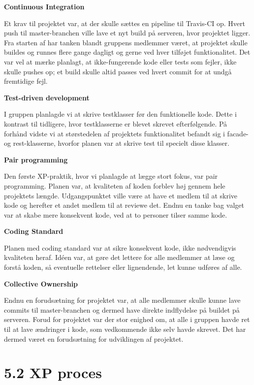 \documentclass[11pt]{report}
\begin{document}
\noindent\textbf{Continuous Integration}

Et krav til projektet var, at der skulle sættes en pipeline til Travis-CI op. Hvert push til master-branchen ville lave et nyt build på serveren, hvor projektet ligger. Fra starten af har tanken blandt gruppens medlemmer været, at projektet skulle buildes og runnes flere gange dagligt og gerne ved hver tilføjet funktionalitet. Det var vel at mærke planlagt, at ikke-fungerende kode eller tests som fejler, ikke skulle pushes op; et build skulle altid passes ved hvert commit for at undgå fremtidige fejl.

\noindent\textbf{Test-driven development}

I gruppen planlagde vi at skrive testklasser før den funktionelle kode. Dette i kontrast til tidligere, hvor testklasserne er blevet skrevet efterfølgende. På forhånd vidste vi at størstedelen af projektets funktionalitet befandt sig i facade- og rest-klasserne, hvorfor planen var at skrive test til specielt disse klasser.

\newpage
\noindent\textbf{Pair programming}

Den første XP-praktik, hvor vi planlagde at lægge stort fokus, var pair programming. Planen var, at kvaliteten af koden forblev høj gennem hele projektets længde. Udgangspunktet ville være at have et medlem til at skrive kode og herefter et andet medlem til at reviewe det. Endnu en tanke bag valget var at skabe mere konsekvent kode, ved at to personer tilser samme kode.

\noindent\textbf{Coding Standard}

Planen med coding standard var at sikre konsekvent kode, ikke nødvendigvis kvaliteten heraf. Idéen var, at gøre det lettere for alle medlemmer at læse og forstå koden, så eventuelle rettelser eller lignendende, let kunne udføres af alle.

\noindent\textbf{Collective Ownership}

Endnu en forudsætning for projektet var, at alle medlemmer skulle kunne lave commits til master-branchen og dermed have direkte indflydelse på buildet på serveren. Forud for projektet var der stor enighed om, at alle i gruppen havde ret til at lave ændringer i kode, som vedkommende ikke selv havde skrevet. Det har dermed været en forudsætning for udviklingen af projektet.

\newpage
\section*{5.2 XP proces}
\end{document}

